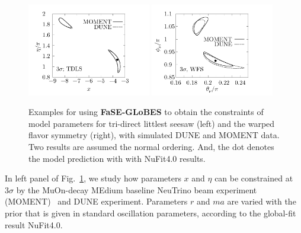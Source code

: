\documentclass[aps,prd,nofootinbib,preprint]{revtex4}
\begin{document}
\begin{figure}[!h]
 \centering
\includegraphics[width=0.48\textwidth]{Figs/x_eta.pdf}
 \includegraphics[width=0.48\textwidth]{Figs/theta_phi.pdf}
  \caption{\label{fig:constraint}Examples for using \textbf{FaSE-GLoBES} to obtain the constraints of model parameters for tri-direct littlest seesaw (left) and the warped flavor symmetry (right), with simulated DUNE and MOMENT data. Two results are assumed the normal ordering. And, the dot denotes the model prediction with with NuFit4.0 results.}
\end{figure}

In left panel of Fig.~\ref{fig:constraint}, we study how parameters $x$ and $\eta$ can be constrained at $3\sigma$ by the MuOn-decay MEdium baseline NeuTrino beam experiment (MOMENT)~\cite{Cao:2014bea} and DUNE experiment. 
Parameters $r$ and $ma$ are varied with the prior that is given in standard oscillation parameters, according to the global-fit result NuFit4.0. 
\end{document}
